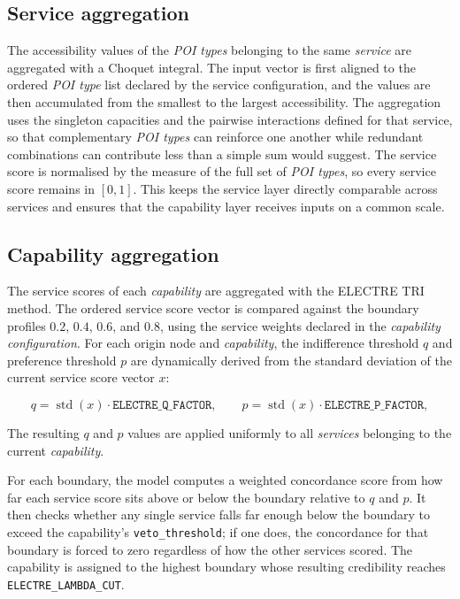 \documentclass{article}
\begin{document}
\subsection{Service aggregation}
The accessibility values of the \emph{POI types} belonging to the same
\emph{service} are aggregated with a Choquet integral. The input vector is first
aligned to the ordered \emph{POI type} list declared by the service
configuration, and the values are then accumulated from the smallest to the
largest accessibility. The aggregation uses the singleton capacities and the
pairwise interactions defined for that service, so that complementary
\emph{POI types} can reinforce one another while redundant combinations can
contribute less than a simple sum would suggest.
The service score is normalised by the measure of the full set of
\emph{POI types}, so every service score remains in \([0,1]\). This keeps the
service layer directly comparable across services and ensures that the
capability layer receives inputs on a common scale.

\subsection{Capability aggregation}
The service scores of each \emph{capability} are aggregated with the
ELECTRE TRI method. The ordered service score vector is compared against the
boundary profiles \(0.2\), \(0.4\), \(0.6\), and \(0.8\), using the service
weights declared in the \emph{capability configuration}. For each origin node
and \emph{capability}, the indifference threshold \(q\) and preference
threshold \(p\) are dynamically derived from the standard deviation of the
current service score vector \(x\):

\begin{equation}
    q = \operatorname{std}(x) \cdot \texttt{ELECTRE\_Q\_FACTOR},
    \qquad
    p = \operatorname{std}(x) \cdot \texttt{ELECTRE\_P\_FACTOR},
\end{equation}

\noindent The resulting \(q\) and \(p\) values are applied uniformly to all
\emph{services} belonging to the current \emph{capability}.

For each boundary, the model computes a weighted concordance score from how
far each service score sits above or below the boundary relative to \(q\)
and \(p\). It then checks whether any single service falls far enough below
the boundary to exceed the capability's \texttt{veto\_threshold}; if one
does, the concordance for that boundary is forced to zero regardless of how
the other services scored. The capability is assigned to the highest
boundary whose resulting credibility reaches \texttt{ELECTRE\_LAMBDA\_CUT}.
\end{document}
